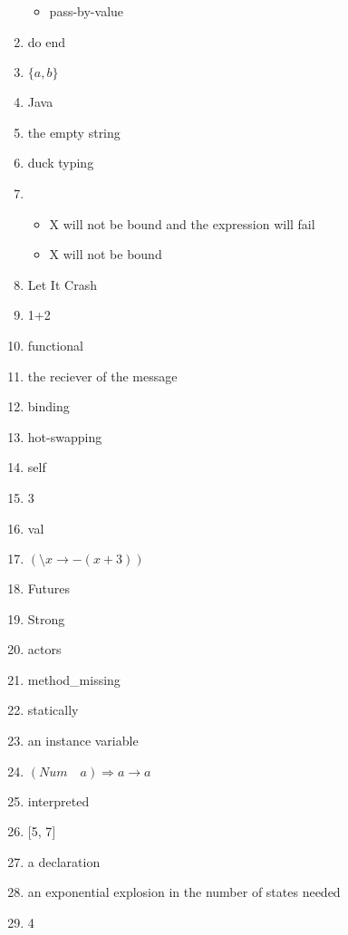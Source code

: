 \documentclass{exam}
\begin{document}
\begin{enumerate}
\begin{itemize}
\item pass-by-value
\end{itemize}
\item do end
\item $\{a,b\}$
\item Java
\item the empty string
\item duck typing
\item \begin{itemize}
\item X will not be bound and the expression will fail
\item X will not be bound
\end{itemize}
\item Let It Crash
\item 1+2
\item functional
\item the reciever of the message
\item binding
\item hot-swapping
\item self
\item 3
\item val
\item $(\setminus x \rightarrow - (x + 3))$
\item Futures
\item Strong
\item actors
\item method\_missing
\item statically
\item an instance variable
\item $(Num \quad a) \Rightarrow a \rightarrow a$
\item interpreted
\item $\lbrack$5, 7$\rbrack$
\item a declaration
\item an exponential explosion in the number of states needed
\item 4
\end{enumerate}
\end{document}
